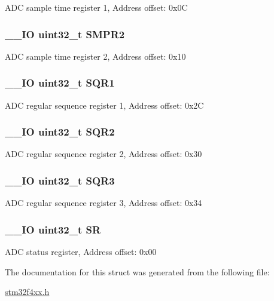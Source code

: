 A\-D\-C sample time register 1, Address offset\-: 0x0\-C \hypertarget{struct_a_d_c___type_def_a6ac83fae8377c7b7fcae50fa4211b0e8}{
\subsubsection[{S\-M\-P\-R2}]{\setlength{\rightskip}{0pt plus 5cm}\-\_\-\-\_\-\-I\-O uint32\-\_\-t S\-M\-P\-R2}}\label{struct_a_d_c___type_def_a6ac83fae8377c7b7fcae50fa4211b0e8}
A\-D\-C sample time register 2, Address offset\-: 0x10 \hypertarget{struct_a_d_c___type_def_a3302e1bcfdfbbfeb58779d0761fb377c}{
\subsubsection[{S\-Q\-R1}]{\setlength{\rightskip}{0pt plus 5cm}\-\_\-\-\_\-\-I\-O uint32\-\_\-t S\-Q\-R1}}\label{struct_a_d_c___type_def_a3302e1bcfdfbbfeb58779d0761fb377c}
A\-D\-C regular sequence register 1, Address offset\-: 0x2\-C \hypertarget{struct_a_d_c___type_def_aab440b0ad8631f5666dd32768a89cf60}{
\subsubsection[{S\-Q\-R2}]{\setlength{\rightskip}{0pt plus 5cm}\-\_\-\-\_\-\-I\-O uint32\-\_\-t S\-Q\-R2}}\label{struct_a_d_c___type_def_aab440b0ad8631f5666dd32768a89cf60}
A\-D\-C regular sequence register 2, Address offset\-: 0x30 \hypertarget{struct_a_d_c___type_def_a97e40d9928fa25a5628d6442f0aa6c0f}{
\subsubsection[{S\-Q\-R3}]{\setlength{\rightskip}{0pt plus 5cm}\-\_\-\-\_\-\-I\-O uint32\-\_\-t S\-Q\-R3}}\label{struct_a_d_c___type_def_a97e40d9928fa25a5628d6442f0aa6c0f}
A\-D\-C regular sequence register 3, Address offset\-: 0x34 \hypertarget{struct_a_d_c___type_def_af6aca2bbd40c0fb6df7c3aebe224a360}{
\subsubsection[{S\-R}]{\setlength{\rightskip}{0pt plus 5cm}\-\_\-\-\_\-\-I\-O uint32\-\_\-t S\-R}}\label{struct_a_d_c___type_def_af6aca2bbd40c0fb6df7c3aebe224a360}
A\-D\-C status register, Address offset\-: 0x00 

The documentation for this struct was generated from the following file\-:\begin{DoxyCompactItemize}
\item 
\hyperlink{stm32f4xx_8h}{stm32f4xx.\-h}\end{DoxyCompactItemize}
